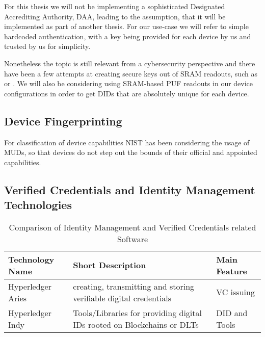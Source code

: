 For this thesis we will not be implementing a sophisticated Designated Accrediting Authority, DAA, leading to the
assumption, that it will be implemented as part of another thesis. For our use-case we will refer to simple
hardcoded authentication, with a key being provided for each device by us and trusted by us for simplicity.


Nonetheless the topic is still relevant from a cybersecurity perspective and there have been a few attempts at creating
secure keys out of SRAM readouts, such as \cite{vinagrero2023sram} or \cite{Niya_Jeffrey_Stiller_2020}.
We will also be considering using SRAM-based PUF readouts in our device configurations in order to get DIDs that are
absolutely unique for each device.

\subsection{Device Fingerprinting} %
\label{sub:Device Fingerprinting}

For classification of device capabilities NIST has been considering the usage of MUDs, so that devices do not step out
the bounds of their official and appointed capabilities. \cite{dodson2021securing}


\subsection{Verified Credentials and Identity Management Technologies} %
\label{sub:Verified Credentials and Identity Management Technologies}

\begin{table}
	\caption{Comparison of Identity Management and Verified Credentials related Software}
	\label{tab:Comparison of Identity Management and Verified Credentials related Software}
	\begin{center}
		\begin{tabular}[c]{|l|p{7cm}|l|}
			\hline
			\textbf{Technology Name}                  & Short Description                             & Main Feature \\
			\hline
			Hyperledger Aries \cite{hyperledger:wiki} & creating, transmitting and storing verifiable
			digital credentials                       & VC issuing                                                   \\
			\hline
			Hyperledger Indy \cite{hyperledger:wiki}  & Tools/Libraries for providing digital IDs
			rooted on Blockchains or DLTs             & DID and Tools                                                \\
			\hline
		\end{tabular}
	\end{center}
\end{table}

